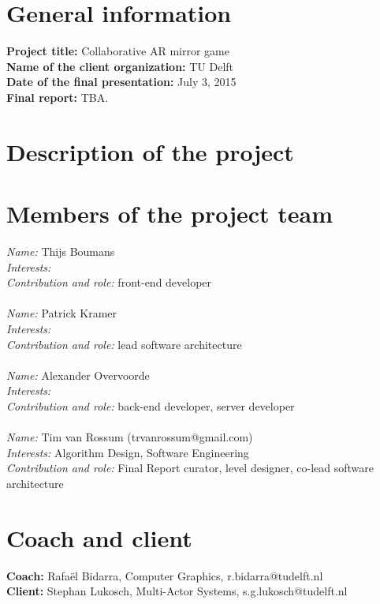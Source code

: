 \documentclass[]{article}
\begin{document}
\section*{General information}
\textbf{Project title:} Collaborative AR mirror game\\
\textbf{Name of the client organization:} TU Delft\\
\textbf{Date of the final presentation:} July 3, 2015\\
\textbf{Final report:} TBA.\\

\section*{Description of the project}

\section*{Members of the project team}
\textit{Name:} Thijs Boumans\\
\textit{Interests:}\\
\textit{Contribution and role:} front-end developer\\
\\
\textit{Name:} Patrick Kramer\\
\textit{Interests:}\\
\textit{Contribution and role:} lead software architecture\\
\\
\textit{Name:} Alexander Overvoorde\\
\textit{Interests:}\\
\textit{Contribution and role:} back-end developer, server developer\\
\\
\textit{Name:} Tim van Rossum (trvanrossum@gmail.com)\\
\textit{Interests:} Algorithm Design, Software Engineering \\
\textit{Contribution and role:} Final Report curator, level designer, co-lead software architecture\\

\section*{Coach and client}
\textbf{Coach:} Rafa\"el Bidarra, Computer Graphics, r.bidarra@tudelft.nl\\
\textbf{Client:} Stephan Lukosch, Multi-Actor Systems, s.g.lukosch@tudelft.nl
\end{document}
